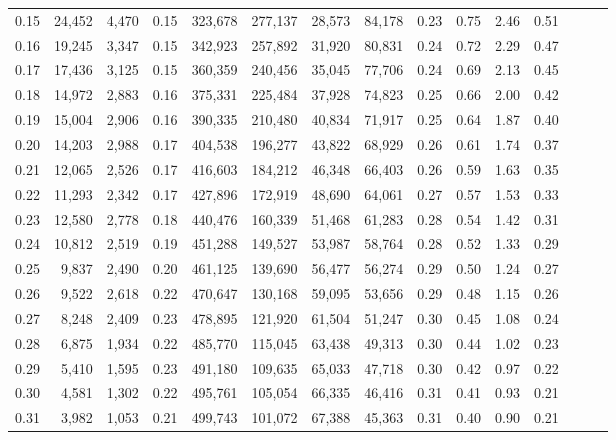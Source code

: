 \begin{tabular}{rrrrrrrrrrrrrrr}
0.15 &  24,452 &  4,470 &  0.15 &  323,678 &  277,137 &   28,573 &   84,178 &  0.23 &  0.75 &  2.46 &      0.51 \\
0.16 &  19,245 &  3,347 &  0.15 &  342,923 &  257,892 &   31,920 &   80,831 &  0.24 &  0.72 &  2.29 &      0.47 \\
0.17 &  17,436 &  3,125 &  0.15 &  360,359 &  240,456 &   35,045 &   77,706 &  0.24 &  0.69 &  2.13 &      0.45 \\
0.18 &  14,972 &  2,883 &  0.16 &  375,331 &  225,484 &   37,928 &   74,823 &  0.25 &  0.66 &  2.00 &      0.42 \\
0.19 &  15,004 &  2,906 &  0.16 &  390,335 &  210,480 &   40,834 &   71,917 &  0.25 &  0.64 &  1.87 &      0.40 \\
0.20 &  14,203 &  2,988 &  0.17 &  404,538 &  196,277 &   43,822 &   68,929 &  0.26 &  0.61 &  1.74 &      0.37 \\
0.21 &  12,065 &  2,526 &  0.17 &  416,603 &  184,212 &   46,348 &   66,403 &  0.26 &  0.59 &  1.63 &      0.35 \\
0.22 &  11,293 &  2,342 &  0.17 &  427,896 &  172,919 &   48,690 &   64,061 &  0.27 &  0.57 &  1.53 &      0.33 \\
0.23 &  12,580 &  2,778 &  0.18 &  440,476 &  160,339 &   51,468 &   61,283 &  0.28 &  0.54 &  1.42 &      0.31 \\
0.24 &  10,812 &  2,519 &  0.19 &  451,288 &  149,527 &   53,987 &   58,764 &  0.28 &  0.52 &  1.33 &      0.29 \\
0.25 &   9,837 &  2,490 &  0.20 &  461,125 &  139,690 &   56,477 &   56,274 &  0.29 &  0.50 &  1.24 &      0.27 \\
0.26 &   9,522 &  2,618 &  0.22 &  470,647 &  130,168 &   59,095 &   53,656 &  0.29 &  0.48 &  1.15 &      0.26 \\
0.27 &   8,248 &  2,409 &  0.23 &  478,895 &  121,920 &   61,504 &   51,247 &  0.30 &  0.45 &  1.08 &      0.24 \\
0.28 &   6,875 &  1,934 &  0.22 &  485,770 &  115,045 &   63,438 &   49,313 &  0.30 &  0.44 &  1.02 &      0.23 \\
0.29 &   5,410 &  1,595 &  0.23 &  491,180 &  109,635 &   65,033 &   47,718 &  0.30 &  0.42 &  0.97 &      0.22 \\
0.30 &   4,581 &  1,302 &  0.22 &  495,761 &  105,054 &   66,335 &   46,416 &  0.31 &  0.41 &  0.93 &      0.21 \\
0.31 &   3,982 &  1,053 &  0.21 &  499,743 &  101,072 &   67,388 &   45,363 &  0.31 &  0.40 &  0.90 &      0.21 \\

\end{tabular}
